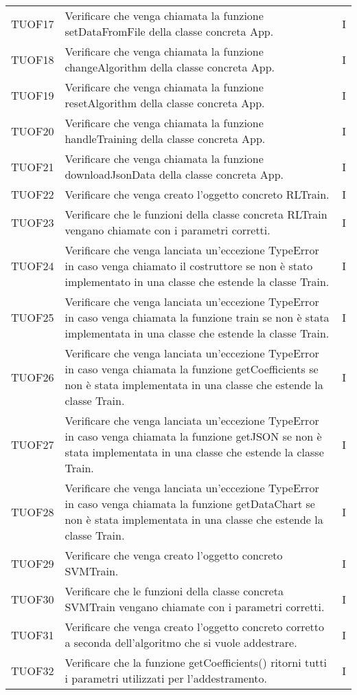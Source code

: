 \begin{longtable}{C{2cm} L{8cm} C{2cm}}
TUOF17 & Verificare che venga chiamata la funzione setDataFromFile della classe concreta App. & I \\
TUOF18 & Verificare che venga chiamata la funzione changeAlgorithm della classe concreta App. & I \\
TUOF19 & Verificare che venga chiamata la funzione resetAlgorithm della classe concreta App. & I \\
TUOF20 & Verificare che venga chiamata la funzione handleTraining della classe concreta App. & I \\
TUOF21 & Verificare che venga chiamata la funzione downloadJsonData della classe concreta App. & I \\
TUOF22 & Verificare che venga creato l’oggetto concreto RLTrain. & I \\
TUOF23 & Verificare che le funzioni della classe concreta RLTrain vengano chiamate con i parametri corretti. & I \\
TUOF24 & Verificare che venga lanciata un’eccezione TypeError in caso venga chiamato il costruttore se non è stato implementato in una classe che estende la classe Train.& I \\
TUOF25 & Verificare che venga lanciata un’eccezione TypeError in caso venga chiamata la funzione train se non è stata implementata in una classe che estende la classe Train.& I \\
TUOF26 & Verificare che venga lanciata un’eccezione TypeError in caso venga chiamata la funzione getCoefficients se non è stata implementata in una classe che estende la classe Train. & I \\
TUOF27 & Verificare che venga lanciata un’eccezione TypeError in caso venga chiamata la funzione getJSON se non è stata implementata in una classe che estende la classe Train.& I \\
TUOF28 & Verificare che venga lanciata un’eccezione TypeError in caso venga chiamata la funzione getDataChart se non è stata implementata in una classe che estende la classe Train.& I \\
TUOF29 & Verificare che venga creato l’oggetto concreto SVMTrain. & I \\
TUOF30 & Verificare che le funzioni della classe concreta SVMTrain vengano chiamate con i parametri corretti. & I \\
TUOF31 & Verificare che venga creato l’oggetto concreto corretto a seconda dell’algoritmo che si vuole addestrare. & I \\
TUOF32 & Verificare che la funzione getCoefficients() ritorni tutti i parametri utilizzati per l’addestramento. & I \\

\end{longtable}
